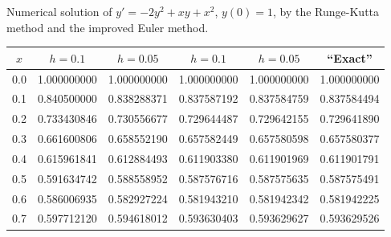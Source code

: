\begin{examplesolution}
\begin{newtable}
  \label{table:3.3.2} Numerical solution of $y'=-2y^{2}+xy+x^{2}$, $y(0)=1$, by the Runge-Kutta
  method and the improved Euler method.
  \begin{center}
    \begin{tabular}{|c|r|r|r|r|r|}
      \hline
      \multicolumn{1}{|c|}{$x$} & \multicolumn{1}{|c|}{$h=0.1$}       & \multicolumn{1}{|c|}{$h=0.05$}   & \multicolumn{1}{|c|}{$h=0.1$} & \multicolumn{1}{|c|}{$h=0.05$} & \multicolumn{1}{|c|}{``Exact''} \\
      \hline
      0.0                       & 1.000000000                         & 1.000000000                      & 1.000000000                   & 1.000000000                    & 1.000000000                     \\
      0.1                       & 0.840500000                         & 0.838288371                      & 0.837587192                   & 0.837584759                    & 0.837584494                     \\
      0.2                       & 0.733430846                         & 0.730556677                      & 0.729644487                   & 0.729642155                    & 0.729641890                     \\
      0.3                       & 0.661600806                         & 0.658552190                      & 0.657582449                   & 0.657580598                    & 0.657580377                     \\
      0.4                       & 0.615961841                         & 0.612884493                      & 0.611903380                   & 0.611901969                    & 0.611901791                     \\
      0.5                       & 0.591634742                         & 0.588558952                      & 0.587576716                   & 0.587575635                    & 0.587575491                     \\
      0.6                       & 0.586006935                         & 0.582927224                      & 0.581943210                   & 0.581942342                    & 0.581942225                     \\
      0.7                       & 0.597712120                         & 0.594618012                      & 0.593630403                   & 0.593629627                    & 0.593629526                     \\

\end{tabular}
\end{center}
\end{newtable}
\end{examplesolution}
